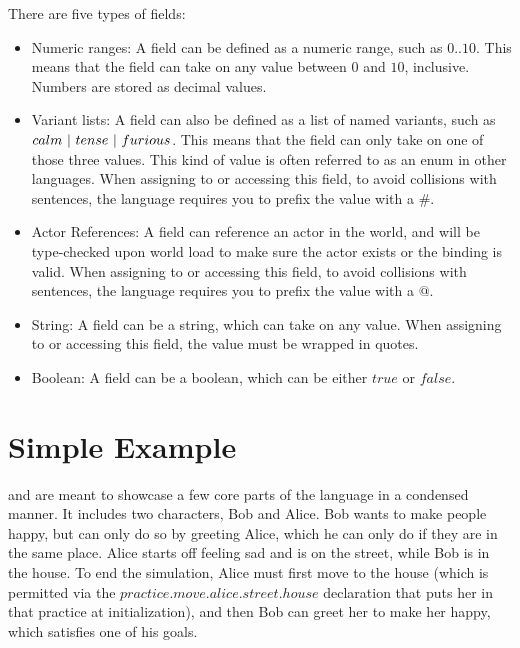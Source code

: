 There are five types of fields:

\begin{itemize}
    \item Numeric ranges: A field can be defined as a numeric range, such as $0..10$.
    This means that the field can take on any value between $0$ and $10$, inclusive.
    Numbers are stored as decimal values.
    \item Variant lists: A field can also be defined as a list of named variants,
    such as $calm\ \text{\textbar}\ tense\ \text{\textbar}\ furious$. This means that the field can only take on one
    of those three values. This kind of value is often referred to as an enum in other
    languages. When assigning to or accessing this field, to avoid collisions with
    sentences, the language requires you to prefix the value with a $\#$.
    \item Actor References: A field can reference an actor in the world, and will
    be type-checked upon world load to make sure the actor exists or the binding is
    valid. When assigning to or accessing this field, to avoid collisions with
    sentences, the language requires you to prefix the value with a $@$.
    \item String: A field can be a string, which can take on any value. When assigning
    to or accessing this field, the value must be wrapped in quotes.
    \item Boolean: A field can be a boolean, which can be either $true$ or $false$.
\end{itemize}

\section{Simple Example} \label{sec:SimpleExample}

 and  are meant to showcase a few core parts of the language in
a condensed manner. It includes two characters, Bob and Alice. Bob wants to make
people happy, but can only do so by greeting Alice, which he can only do if they are
in the same place. Alice starts off feeling sad and is on the street, while Bob is
in the house. To end the simulation, Alice must first move to the house (which is
permitted via the $practice.move.alice.street.house$ declaration that puts her in that
practice at initialization), and then Bob can greet her to make her happy, which
satisfies one of his goals.

